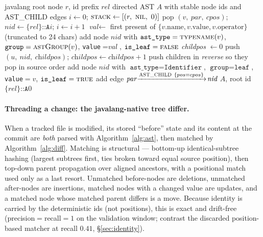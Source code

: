 \documentclass[11pt,a4paper]{article}
\newcommand{\code}[1]{\texttt{#1}}
\newcommand{\edge}[1]{\textsc{#1}}
\begin{document}
	\begin{algorithm}[H]
	\caption{\textsc{BuildAstSubgraph}: deterministic AST of one file/method root}\label{alg:ast}
	\begin{algorithmic}[1]
	\Require javalang root node $r$, id prefix $rel$
	\Ensure directed AST $A$ with stable node ids and \edge{AST\_CHILD} edges
	\State $i \gets 0$; \; $\textproc{stack} \gets [(r,\ \textsc{nil},\ 0)]$
	  \State pop $(v,\ \textit{par},\ \textit{cpos})$; \; $\textit{nid} \gets \{rel\}\code{::A}i$; \; $i \gets i+1$
	  \If{$v$ is a javalang \code{Node}}
	     \State $\textit{val} \gets$ first present of $\{v.\text{name}, v.\text{value}, v.\text{operator}\}$ (truncated to 24 chars)
	     \State add node $\textit{nid}$ with $\code{ast\_type}=\textproc{typename}(v)$, $\code{group}=\textproc{astGroup}(v)$, \code{value}$=\textit{val}$, $\code{is\_leaf}=\textsc{false}$
	     \State \textit{childpos} $\gets 0$
	        \State push $(u,\ \textit{nid},\ \textit{childpos})$; \; $\textit{childpos} \gets \textit{childpos}+1$
	     \EndFor
	     \State push children in \emph{reverse} so they pop in source order
	  \Else {}
	     \State add node $\textit{nid}$ with $\code{ast\_type}=\code{Identifier}$, $\code{group}=\code{leaf}$, \code{value}$=v$, $\code{is\_leaf}=\textsc{true}$
	  \EndIf
	   add edge $\textit{par}\!\xrightarrow{\edge{AST\_CHILD}\ \{pos=cpos\}}\!\textit{nid}$ \EndIf
	\EndWhile
	\State \Return $A$, root id $\{rel\}\code{::A}0$
	\end{algorithmic}
	\end{algorithm}

	\paragraph{Threading a change: the javalang-native tree differ.} When a tracked
	file is modified, its stored ``before'' state and its content at the commit are
	\emph{both} parsed with Algorithm~\ref{alg:ast}, then matched by
	Algorithm~\ref{alg:diff}. Matching is structural --- bottom-up identical-subtree
	hashing (largest subtrees first, ties broken toward equal source position), then
	top-down parent propagation over aligned ancestors, with a positional match used
	only as a last resort. Unmatched before-nodes are deletions, unmatched
	after-nodes are insertions, matched nodes with a changed value are updates, and a
	matched node whose matched parent differs is a move. Because identity is carried
	by the deterministic ids (not positions), this is exact and drift-free
	(precision$=$recall$=1$ on the validation window; contrast the discarded
	position-based matcher at recall $0.41$, \S\ref{sec:identity}).
\end{document}
